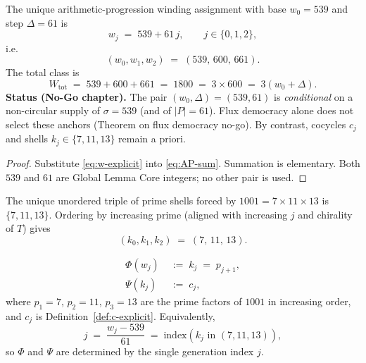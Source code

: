 \begin{lemma}
\label{lem:canonical-w}
The unique arithmetic-progression winding assignment with base \(w_0=539\) and
step \(\Delta=61\) is
\begin{equation}
\label{eq:w-explicit}
w_j \;=\; 539 + 61\,j,\qquad j\in\{0,1,2\},
\end{equation}
i.e.
\[
(w_0,w_1,w_2) \;=\; (539,\,600,\,661).
\]
The total class is
\begin{equation}
\label{eq:Wtot}
W_{\mathrm{tot}} \;=\; 539+600+661 \;=\; 1800 \;=\; 3\times 600 \;=\; 3(w_0+\Delta).
\end{equation}
\textbf{Status (No-Go chapter).}
The pair \((w_0,\Delta)=(539,61)\) is \emph{conditional} on a non-circular supply
of \(\sigma=539\) (and of \(|P|=61\)). Flux democracy alone does not select
these anchors (Theorem on flux democracy no-go). By contrast, cocycles
\(c_j\) and shells \(k_j\in\{7,11,13\}\) remain a priori.
\end{lemma}

\begin{proof}
Substitute \eqref{eq:w-explicit} into \eqref{eq:AP-sum}. Summation is elementary.
Both \(539\) and \(61\) are Global Lemma Core integers; no other pair is used.
\end{proof}

\begin{lemma}
\label{lem:canonical-k}
The unique unordered triple of prime shells forced by \(1001=7\times 11\times 13\)
is \(\{7,11,13\}\). Ordering by increasing prime (aligned with increasing
\(j\) and chirality of \(T\)) gives
\begin{equation}
\label{eq:k-explicit}
(k_0,k_1,k_2) \;=\; (7,\,11,\,13).
\end{equation}
\end{lemma}

\begin{definition}
\label{def:PhiPsi}
\begin{align}
\Phi(w_j) &\;:=\; k_j \;=\; p_{j+1},
  \label{eq:Phi}\\
\Psi(k_j) &\;:=\; c_j,
  \label{eq:Psi}
\end{align}
where \(p_1=7\), \(p_2=11\), \(p_3=13\) are the prime factors of \(1001\) in
increasing order, and \(c_j\) is Definition~\ref{def:c-explicit}. Equivalently,
\[
j \;=\; \frac{w_j-539}{61} \;=\; \mathrm{index}(k_j\text{ in }(7,11,13)),
\]
so \(\Phi\) and \(\Psi\) are determined by the single generation index \(j\).
\end{definition}

